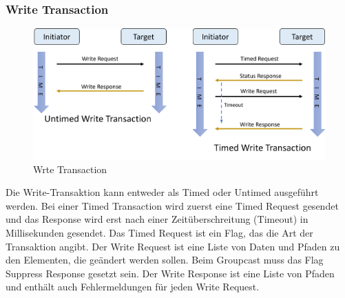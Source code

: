 \documentclass[12pt, a4paper]{article}
\begin{document}
\subsubsection{Write Transaction}
\begin{figure}[h]
  \centering
  \includegraphics[scale=0.5]{write}
  \caption{Wrte Transaction}
  \label{Write Transaction}
\end{figure}
\par Die Write-Transaktion kann entweder als Timed oder Untimed ausgeführt werden. Bei einer Timed Transaction wird zuerst eine Timed Request gesendet und das Response wird erst nach einer Zeitüberschreitung (Timeout) in Millisekunden gesendet. Das Timed Request ist ein Flag, das die Art der Transaktion angibt. Der Write Request ist eine Liste von Daten und Pfaden zu den Elementen, die geändert werden sollen. Beim Groupcast muss das Flag Suppress Response gesetzt sein.  Der Write Response ist eine Liste von Pfaden und enthält auch Fehlermeldungen für jeden Write Request.
\end{document}
